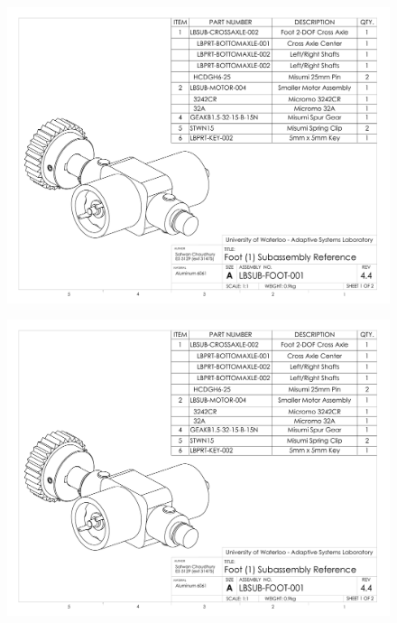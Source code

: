 \begin{figure}[!h]
	\begin{center}
    \includegraphics[scale=0.72,angle=90]{fig/drawings/lbsub-foot-001.pdf}
	\end{center}
\end{figure}

\begin{figure}[!h]
	\begin{center}
    \includegraphics[scale=0.72,angle=90,page=2]{fig/drawings/lbsub-foot-001.pdf}
	\end{center}
\end{figure}

